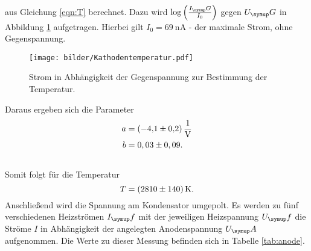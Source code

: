 aus Gleichung \eqref{eqn:T} berechnet.
Dazu wird $\log{\left(\frac{I_\su{G}}{I_0}\right)}$ gegen $U_\su{G}$ in Abbildung \ref{fig:g} aufgetragen.
Hierbei gilt $I_0 = \SI{69}{\nano\ampere}$ - der maximale Strom, ohne Gegenspannung.
\begin{figure}[H]
  \centering
  \texttt{[image: bilder/Kathodentemperatur.pdf]}
  \caption{Strom in Abhängigkeit der Gegenspannung zur Bestimmung der Temperatur.}
  \label{fig:g}
\end{figure}
Daraus ergeben sich die Parameter
\begin{align}
  a &= \SI[per-mode=fraction]{-4,1\pm0,2}{\per\volt}\\ \notag
  b &= 0,03\pm0,09.\\ \notag
\end{align}
Somit folgt für die Temperatur
\begin{equation}
  T = \SI{2810\pm140}{\kelvin}. \notag
\end{equation}
Anschließend wird die Spannung am Kondensator umgepolt. Es werden zu fünf verschiedenen
Heizströmen $I_\su{f}$ mit der jeweiligen Heizspannung $U_\su{f}$ die Ströme $I$
in Abhängigkeit der angelegten Anodenspannung $U_\su{A}$ aufgenommen.
Die Werte zu dieser Messung befinden sich in Tabelle \ref{tab:anode}.
